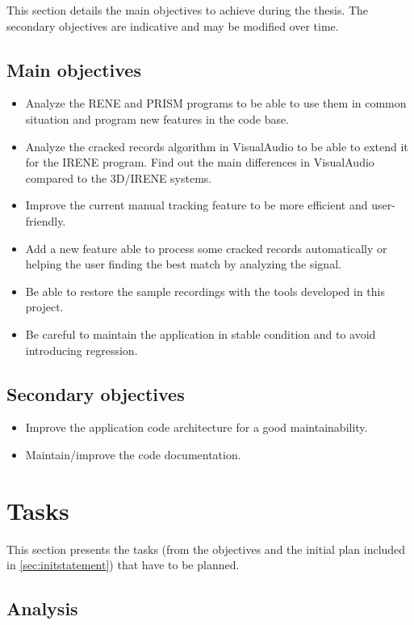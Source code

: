 This section details the main objectives to achieve during the thesis. The secondary objectives are indicative and may be modified over time.

\subsection{Main objectives}

\begin{itemize}
    \item Analyze the RENE and PRISM programs to be able to use them in common situation and program new features in the code base.
    \item Analyze the cracked records algorithm in VisualAudio to be able to extend it for the IRENE program. Find out the main differences in VisualAudio compared to the 3D/IRENE systems.
    \item Improve the current manual tracking feature to be more efficient and user-friendly.
    \item Add a new feature able to process some cracked records automatically or helping the user finding the best match by analyzing the signal.
    \item Be able to restore the sample recordings with the tools developed in this project.
    \item Be careful to maintain the application in stable condition and to avoid introducing regression.
\end{itemize}

\subsection{Secondary objectives}

\begin{itemize}
    \item Improve the application code architecture for a good maintainability.
    \item Maintain/improve the code documentation.
\end{itemize}

\section{Tasks}

This section presents the tasks (from the objectives and the initial plan included in \autoref{sec:initstatement}) that have to be planned.

\subsection{Analysis}

